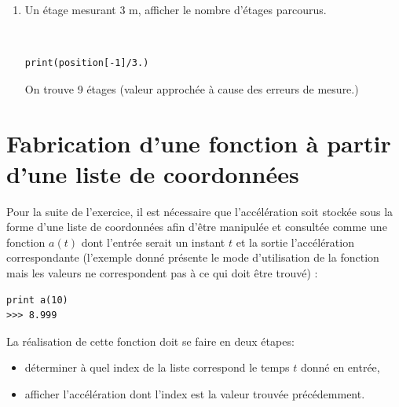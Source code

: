 \documentclass[a4paper,12pt]{article}
\begin{document}
\begin{enumerate}
\begin{enumerate}
\begin{solution}
\begin{figure}[!ht]
\begin{center}
  \label{fig2}
 \end{center}
\end{figure}
\end{solution}
\item Un étage mesurant 3 m, afficher le nombre d'étages parcourus.
\begin{solution}~\ \\
\begin{verbatim}
print(position[-1]/3.)
\end{verbatim}
On trouve 9 étages (valeur approchée à cause des erreurs de mesure.)
\end{solution}
\end{enumerate}
\end{enumerate}

\section*{Fabrication d'une fonction à partir d'une liste de coordonnées}

Pour la suite de l'exercice, il est nécessaire que l'accélération soit stockée sous la forme d'une liste de coordonnées afin d'être manipulée et consultée comme une fonction $a(t)$ dont l'entrée serait un instant $t$ et la sortie l'accélération correspondante (l'exemple donné présente le mode d'utilisation de la fonction mais les valeurs ne correspondent pas à ce qui doit être trouvé) :
\begin{verbatim}
print a(10)
>>> 8.999
\end{verbatim}

La réalisation de cette fonction doit se faire en deux étapes:
\begin{itemize}
 \item déterminer à quel index de la liste correspond le temps $t$ donné en entrée,
 \item afficher l'accélération dont l'index est la valeur trouvée précédemment.
\end{itemize}
\end{document}
